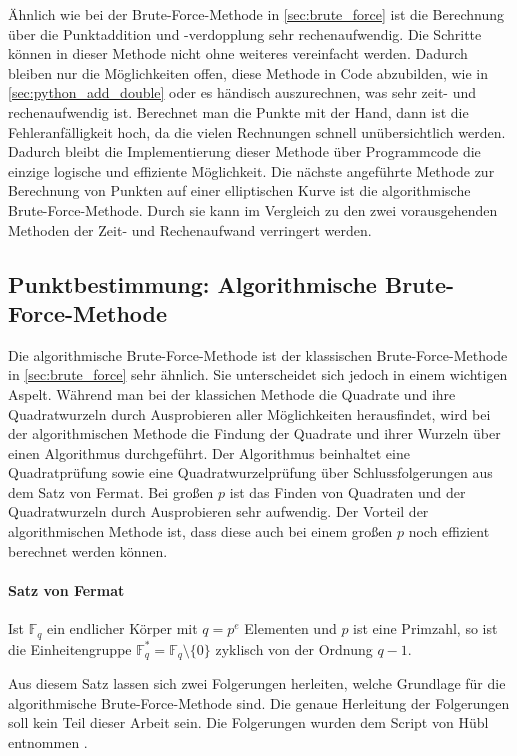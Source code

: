 Ähnlich wie bei der Brute-Force-Methode in \ref{sec:brute_force} ist die Berechnung über die Punktaddition und -verdopplung sehr rechenaufwendig. Die Schritte können in dieser Methode nicht ohne weiteres vereinfacht werden. Dadurch bleiben nur die Möglichkeiten offen, diese Methode in Code abzubilden, wie in \ref{sec:python_add_double} oder es händisch auszurechnen, was sehr zeit- und rechenaufwendig ist. Berechnet man die Punkte mit der Hand, dann ist die Fehleranfälligkeit hoch, da die vielen Rechnungen schnell unübersichtlich werden. Dadurch bleibt die Implementierung dieser Methode über Programmcode die einzige logische und effiziente Möglichkeit. Die nächste angeführte Methode zur Berechnung von Punkten auf einer elliptischen Kurve ist die algorithmische Brute-Force-Methode. Durch sie kann im Vergleich zu den zwei vorausgehenden Methoden der Zeit- und Rechenaufwand verringert werden.

\subsection{Punktbestimmung: Algorithmische Brute-Force-Methode}
Die algorithmische Brute-Force-Methode ist der klassischen Brute-Force-Methode in \ref{sec:brute_force} sehr ähnlich. Sie unterscheidet sich jedoch in einem wichtigen Aspelt. Während man bei der klassichen Methode die Quadrate und ihre Quadratwurzeln durch Ausprobieren aller Möglichkeiten herausfindet, wird bei der algorithmischen Methode die Findung der Quadrate und ihrer Wurzeln über einen Algorithmus durchgeführt. Der Algorithmus beinhaltet eine Quadratprüfung sowie eine Quadratwurzelprüfung über Schlussfolgerungen aus dem Satz von Fermat. Bei großen $p$ ist das Finden von Quadraten und der Quadratwurzeln durch Ausprobieren sehr aufwendig. Der Vorteil der algorithmischen Methode ist, dass diese auch bei einem großen $p$ noch effizient berechnet werden können. 

\paragraph{Satz von Fermat}
Ist $\mathbb{F}_q$ ein endlicher Körper mit $q = p^e$ Elementen und $p$ ist eine Primzahl, so ist die Einheitengruppe $\mathbb{F}_q^* = \mathbb{F}_q \setminus \{0\}$ zyklisch von der Ordnung $q - 1$.

Aus diesem Satz lassen sich zwei Folgerungen herleiten, welche Grundlage für die algorithmische Brute-Force-Methode sind. Die genaue Herleitung der Folgerungen soll kein Teil dieser Arbeit sein. Die Folgerungen wurden dem Script von Hübl entnommen \cite[S. 269]{Dr.ReinholdHubl.2022}.


